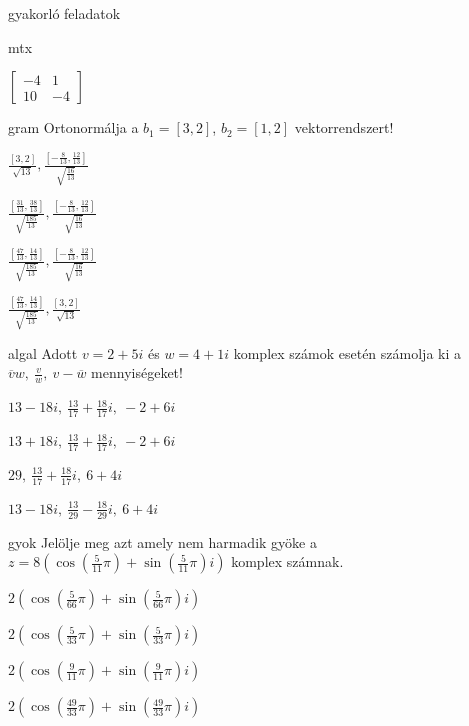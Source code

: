 \documentclass[12pt]{article}
\begin{document}
\begin{quiz}{gyakorló feladatok}
\begin{multi}{mtx}
\item  $\left[{\begin{array}{cc}-4& 1\\ 10& -4\end{array}}\right]$
\end{multi}
\begin{multi}{gram}
Ortonormálja a $ b_1=\left[3, 2\right] $, $ b_2=\left[1, 2\right] $ vektorrendszert!
\item* $ \frac{\left[3, 2\right]}{\sqrt{13}}, \frac{\left[-\frac{8}{13}, \frac{12}{13}\right]}{\sqrt{\frac{16}{13}}} $
\item  $ \frac{\left[\frac{31}{13}, \frac{38}{13}\right]}{\sqrt{\frac{185}{13}}}, \frac{\left[-\frac{8}{13}, \frac{12}{13}\right]}{\sqrt{\frac{16}{13}}} $
\item  $ \frac{\left[\frac{47}{13}, \frac{14}{13}\right]}{\sqrt{\frac{185}{13}}}, \frac{\left[-\frac{8}{13}, \frac{12}{13}\right]}{\sqrt{\frac{16}{13}}} $
\item  $ \frac{\left[\frac{47}{13}, \frac{14}{13}\right]}{\sqrt{\frac{185}{13}}}, \frac{\left[3, 2\right]}{\sqrt{13}} $
\end{multi}
\begin{multi}{algal}
Adott $v=2+5i$ és $w=4+1i$ komplex számok esetén számolja ki a
$\overline{v}w,\ \frac{v}{w}, \ v-\overline{w}$ mennyiségeket!
\item* $13-18i,\ \frac{13}{17}+\frac{18}{17}i,\ -2+6i$
\item  $13+18i,\ \frac{13}{17}+\frac{18}{17}i,\ -2+6i$
\item  $29,\ \frac{13}{17}+\frac{18}{17}i,\ 6+4i$
\item  $13-18i,\ \frac{13}{29}-\frac{18}{29}i,\ 6+4i$
\end{multi}
\begin{multi}{gyok}
Jelölje meg azt amely nem harmadik gyöke a $z=8\left(\cos(\frac{5}{11}\pi)+\sin(\frac{5}{11}\pi)i\right)$ komplex számnak.
\item* $2\left(\cos(\frac{5}{66}\pi)+\sin(\frac{5}{66}\pi)i\right)$
\item  $2\left(\cos(\frac{5}{33}\pi)+\sin(\frac{5}{33}\pi)i\right)$
\item  $2\left(\cos(\frac{9}{11}\pi)+\sin(\frac{9}{11}\pi)i\right)$
\item  $2\left(\cos(\frac{49}{33}\pi)+\sin(\frac{49}{33}\pi)i\right)$
\end{multi}
\end{quiz}
\end{document}
